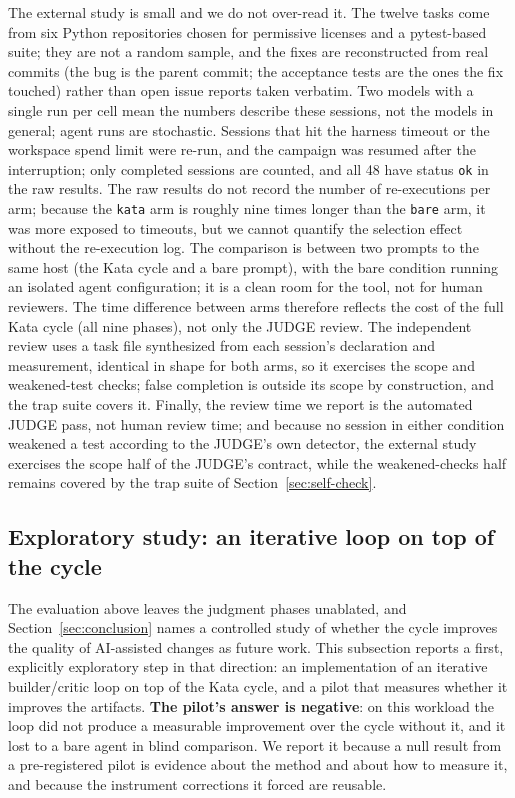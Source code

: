 \documentclass[11pt]{article}
\begin{document}
The external study is small and we do not over-read it. The twelve tasks
come from six Python repositories chosen for permissive licenses and a
pytest-based suite; they are not a random sample, and the fixes are
reconstructed from real commits (the bug is the parent commit; the
acceptance tests are the ones the fix touched) rather than open issue
reports taken verbatim. Two models with a single run per cell mean the
numbers describe these sessions, not the models in general; agent runs are
stochastic. Sessions that hit the harness timeout or the workspace spend
limit were re-run, and the campaign was resumed after the interruption;
only completed sessions are counted, and all 48 have status \texttt{ok} in
the raw results. The raw results do not record the number of re-executions
per arm; because the \texttt{kata} arm is roughly nine times longer than
the \texttt{bare} arm, it was more exposed to timeouts, but we cannot
quantify the selection effect without the re-execution log. The comparison is between two prompts to the
same host (the
Kata cycle and a bare prompt), with the bare condition running an isolated
agent configuration; it is a clean room for the tool, not for human
reviewers. The time difference between arms therefore reflects the cost
of the full Kata cycle (all nine phases), not only the JUDGE review. The independent review uses a task file synthesized from each
session's declaration and measurement, identical in shape for both arms,
so it exercises the scope and weakened-test checks; false completion is
outside its scope by construction, and the trap suite covers it. Finally,
the review time we report is the automated JUDGE pass,
not human review time; and because no session in either condition weakened
a test according to the JUDGE's own detector, the external study exercises the
scope half of the JUDGE's
contract, while the weakened-checks half remains covered by the trap suite
of Section~\ref{sec:self-check}.

\subsection{Exploratory study: an iterative loop on top of the cycle}
\label{sec:gauntlet-pilot}

The evaluation above leaves the judgment phases unablated, and Section~\ref{sec:conclusion}
names a controlled study of whether the cycle improves the quality of
AI-assisted changes as future work. This subsection reports a first, explicitly
exploratory step in that direction: an implementation of an iterative
builder/critic loop on top of the Kata cycle, and a pilot that measures whether
it improves the artifacts. \textbf{The pilot's answer is negative}: on this
workload the loop did not produce a measurable improvement over the cycle
without it, and it lost to a bare agent in blind comparison. We report it
because a null result from a pre-registered pilot is evidence about the method
and about how to measure it, and because the instrument corrections it forced
are reusable.
\end{document}

